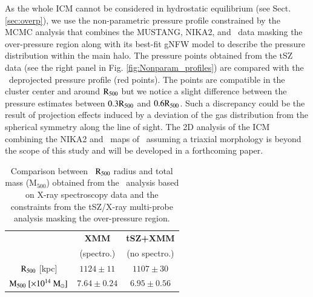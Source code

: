\documentclass[traditabstract]{aa}
\begin{document}
\indent As the whole ICM cannot be considered in hydrostatic equilibrium (see Sect. \ref{sec:overp}), we use the non-parametric pressure profile constrained by the MCMC analysis that combines the MUSTANG, NIKA2, and \planck\ data masking the over-pressure region along with its best-fit gNFW model to describe the pressure distribution within the main halo. The pressure points obtained from the tSZ data (see the right panel in Fig. \ref{fig:Nonparam_profiles}) are compared with the \xmm\ deprojected pressure profile (red points). The points are compatible in the cluster center and around $\rm{R_{500}}$ but we notice a slight difference between the pressure estimates between $0.3 \rm{R_{500}}$ and $0.6 \rm{R_{500}}$. Such a discrepancy could be the result of projection effects induced by a deviation of the gas distribution from the spherical symmetry along the line of sight. The 2D analysis of the ICM combining the NIKA2 and \xmm\ maps of \psz\ assuming a triaxial morphology is beyond the scope of this study and will be developed in a forthcoming paper.\\
\begin{table}[h!]
\begin{center}
\begin{tabular}{ccc}
\hline
\hline
 & \textbf{XMM} & \textbf{tSZ+XMM} \\
 & (spectro.) & (no spectro.) \\
\hline
$\rm{R_{500}}$ [kpc] & $1124 \pm 11$ & $1107 \pm 30$\\
$\rm{M_{500}}~[\mathrm{\times 10^{14}~M_{\odot}}]$ & $7.64 \pm 0.24$ & $6.95 \pm 0.56$\\
\hline
\hline
\end{tabular}
\end{center}
\caption{{\footnotesize Comparison between \psz\ $\rm{R_{500}}$ radius and total mass ($\mathrm{M_{500}}$) obtained from the \xmm\ analysis based on X-ray spectroscopy data and the constraints from the tSZ/X-ray multi-probe analysis masking the over-pressure region.}}
\label{tab:compare_xmm_nika2}
\end{table}
\end{document}
